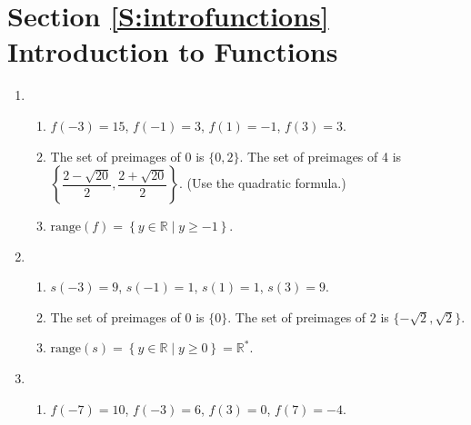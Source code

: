 \section*{Section \ref{S:introfunctions} Introduction to Functions}

\begin{enumerate}
\item \begin{enumerate}
\item 
$f \left( -3 \right) = 15$, 
$f \left( -1 \right) = 3$, 
$f \left( 1 \right) = -1$, 
$f \left( 3 \right) = 3$.

\item The set of preimages of  0  is $\{0, 2 \}$. The set of preimages of 4  is   
$\left\{ \dfrac{{2 - \sqrt {20} }}{2}, \dfrac{{2 + \sqrt {20} }}{2} \right\}$.  (Use the quadratic formula.)


\addtocounter{enumii}{1}
\item $\text{range} \left( f \right) = \left\{ y \in \mathbb{R} \mid y \geq  - 1 \right\}$.
\end{enumerate}

\item \begin{enumerate}
\item $s \left( -3 \right) = 9$,
$s \left( -1 \right) = 1$,
$s \left( 1 \right) = 1$,
$s \left( 3 \right) = 9$.




\item The set of preimages of  0  is $\{ 0 \}$. The set of preimages of 2 is 
$\{ -\sqrt{2}, \sqrt{2} \}$.

\addtocounter{enumii}{1}
\item $\text{range} \left( s \right) = \left\{ y \in \mathbb{R} \mid y \geq  0 \right\} = 
\mathbb{R}^*$.
\end{enumerate}





\item \begin{enumerate}
\item 
$f \left( -7 \right) = 10$, 
$f \left( -3 \right) = 6$, 
$f \left( 3 \right) = 0$, 
$f \left( 7 \right) = -4$.


\end{enumerate}
\end{enumerate}
